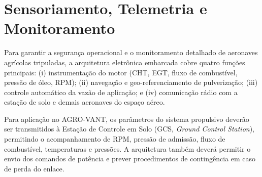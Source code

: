 \documentclass[a4paper,12pt]{article}
\begin{document}
\section{Sensoriamento, Telemetria e Monitoramento}

Para garantir a segurança operacional e o monitoramento detalhado de aeronaves agrícolas tripuladas, a arquitetura eletrônica embarcada cobre quatro funções principais: (i) instrumentação do motor (CHT, EGT, fluxo de combustível, pressão de óleo, RPM); (ii) navegação e geo-referenciamento de pulverização; (iii) controle automático da vazão de aplicação; e (iv) comunicação rádio com a estação de solo e demais aeronaves do espaço aéreo.

Para aplicação no AGRO-VANT, os parâmetros do sistema propulsivo deverão ser transmitidos à Estação de Controle em Solo (GCS, \textit{Ground Control Station}), permitindo o acompanhamento de RPM, pressão de admissão, fluxo de combustível, temperaturas e pressões. A arquitetura também deverá permitir o envio dos comandos de potência e prever procedimentos de contingência em caso de perda do enlace.
\end{document}

